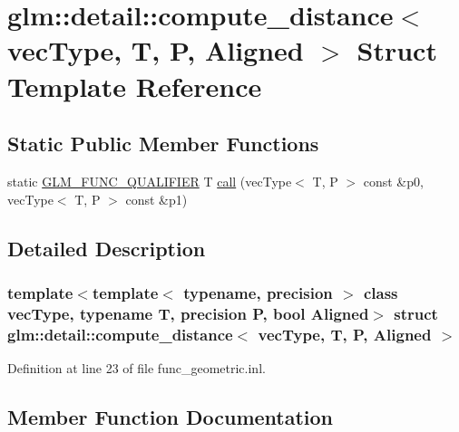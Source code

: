 \hypertarget{structglm_1_1detail_1_1compute__distance}{}\section{glm\+::detail\+::compute\+\_\+distance$<$ vec\+Type, T, P, Aligned $>$ Struct Template Reference}
\label{structglm_1_1detail_1_1compute__distance}
\subsection*{Static Public Member Functions}
\begin{DoxyCompactItemize}
\item 
static \mbox{\hyperlink{setup_8hpp_a33fdea6f91c5f834105f7415e2a64407}{G\+L\+M\+\_\+\+F\+U\+N\+C\+\_\+\+Q\+U\+A\+L\+I\+F\+I\+ER}} T \mbox{\hyperlink{structglm_1_1detail_1_1compute__distance_ae3530a70eb2be3a5e5760ca95aeb5cc4}{call}} (vec\+Type$<$ T, P $>$ const \&p0, vec\+Type$<$ T, P $>$ const \&p1)
\end{DoxyCompactItemize}


\subsection{Detailed Description}
\subsubsection*{template$<$template$<$ typename, precision $>$ class vec\+Type, typename T, precision P, bool Aligned$>$\newline
struct glm\+::detail\+::compute\+\_\+distance$<$ vec\+Type, T, P, Aligned $>$}



Definition at line 23 of file func\+\_\+geometric.\+inl.



\subsection{Member Function Documentation}
\mbox{\label{structglm_1_1detail_1_1compute__distance_ae3530a70eb2be3a5e5760ca95aeb5cc4}} 
